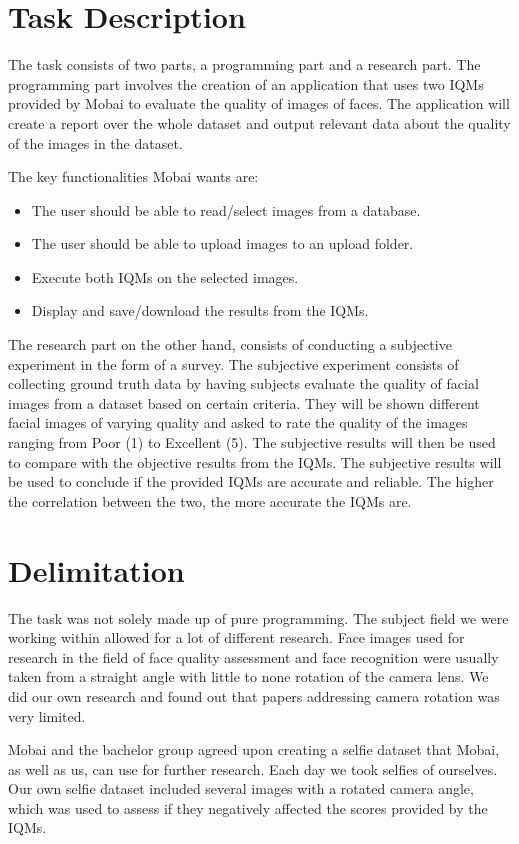 \section{Task Description}
The task consists of two parts, a programming part and a research part. The programming part involves the creation of an application that uses two IQMs provided by Mobai to evaluate the quality of images of faces.  The application will create a report over the whole dataset and output relevant data about the quality of the images in the dataset. 

The key functionalities Mobai wants are: 
\begin{itemize}
    \item The user should be able to read/select images from a database.
    \item The user should be able to upload images to an upload folder.
    \item Execute both IQMs on the selected images.
    \item Display and save/download the results from the IQMs. 
\end{itemize}

The research part on the other hand, consists of conducting a subjective experiment in the form of a survey. The subjective experiment consists of collecting ground truth data by having subjects evaluate the quality of facial images from a dataset based on certain criteria. They will be shown different facial images of varying quality and asked to rate the quality of the images ranging from Poor (1) to Excellent (5). The subjective results will then be used to compare with the objective results from the IQMs. The subjective results will be used to conclude if the provided IQMs are accurate and reliable. The higher the correlation between the two, the more accurate the IQMs are. 

\section{Delimitation}
The task was not solely made up of pure programming. The subject field we were working within allowed for a lot of different research. Face images used for research in the field of face quality assessment and face recognition were usually taken from a straight angle with little to none rotation of the camera lens. We did our own research and found out that papers addressing camera rotation was very limited. 

Mobai and the bachelor group agreed upon creating a selfie dataset that Mobai, as well as us, can use for further research. Each day we took selfies of ourselves. Our own selfie dataset included several images with a rotated camera angle, which was used to assess if they negatively affected the scores provided by the IQMs. 

